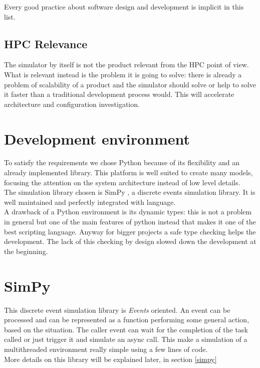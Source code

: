 Every good practice about software design and development is implicit in this
list.

\subsection{HPC Relevance}
The simulator by itself is not the product relevant from the HPC point of view.
What is relevant instead is the problem it is going to solve: there is already a
problem of scalability of a product and the simulator should solve or help to
solve it faster than a traditional development process would. This will accelerate
architecture and configuration investigation.

\section{Development environment}
To satisfy the requirements we chose Python because of its flexibility and
an already implemented library. This platform is well suited  to create many
models, focusing the attention on the system architecture instead of low level
details. \\
The simulation library chosen is SimPy \cite{simpy}, a discrete events
simulation library. It is well maintained and perfectly integrated with
language. \\
A drawback of a Python environment is its dynamic types: this is not a problem
in general but one of the main features of python instead that makes it one of
the best scripting language. Anyway for bigger projects a safe type checking
helps the development. The lack of this checking by design slowed down the
development at the beginning.

\section{SimPy}
This discrete event simulation library is \textit{Events} oriented. An event can
be processed and can be represented as a function performing some general
action, based on the situation. The caller event can wait for the completion of
the task called or just trigger it and simulate an async call. This make a
simulation of a multithreaded environment really simple using a few lines of
code. \\
More details on this library will be explained later, in section \ref{simpy}


